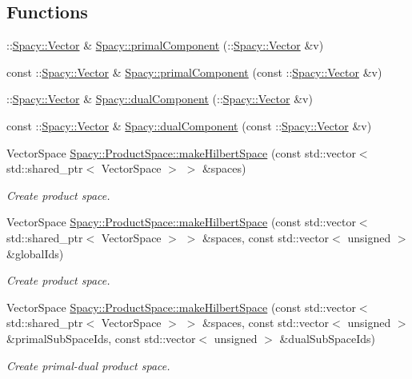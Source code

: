 \subsection*{Functions}
\begin{DoxyCompactItemize}
\item 
\+::\hyperlink{classSpacy_1_1Vector}{Spacy\+::\+Vector} \& \hyperlink{group__ProductSpaceGroup_gaa040ba5c24284687e0df19c99dd688a6}{Spacy\+::primal\+Component} (\+::\hyperlink{classSpacy_1_1Vector}{Spacy\+::\+Vector} \&v)
\item 
const \+::\hyperlink{classSpacy_1_1Vector}{Spacy\+::\+Vector} \& \hyperlink{group__ProductSpaceGroup_ga88c5bcc74072f75c63ab7d9448f80a7e}{Spacy\+::primal\+Component} (const \+::\hyperlink{classSpacy_1_1Vector}{Spacy\+::\+Vector} \&v)
\item 
\+::\hyperlink{classSpacy_1_1Vector}{Spacy\+::\+Vector} \& \hyperlink{group__ProductSpaceGroup_gafe51c084e3b03205db94e91309e834f7}{Spacy\+::dual\+Component} (\+::\hyperlink{classSpacy_1_1Vector}{Spacy\+::\+Vector} \&v)
\item 
const \+::\hyperlink{classSpacy_1_1Vector}{Spacy\+::\+Vector} \& \hyperlink{group__ProductSpaceGroup_gabe5978657aab46b1575e2521b336407d}{Spacy\+::dual\+Component} (const \+::\hyperlink{classSpacy_1_1Vector}{Spacy\+::\+Vector} \&v)
\item 
Vector\+Space \hyperlink{group__ProductSpaceGroup_gad4b421dd4563c7d575550ab4d5d3ff0d}{Spacy\+::\+Product\+Space\+::make\+Hilbert\+Space} (const std\+::vector$<$ std\+::shared\+\_\+ptr$<$ Vector\+Space $>$ $>$ \&spaces)
\begin{DoxyCompactList}\small\item\em Create product space. \end{DoxyCompactList}\item 
Vector\+Space \hyperlink{group__ProductSpaceGroup_gaee9c55c4b0f0b9d41bb6e1eba80f829f}{Spacy\+::\+Product\+Space\+::make\+Hilbert\+Space} (const std\+::vector$<$ std\+::shared\+\_\+ptr$<$ Vector\+Space $>$ $>$ \&spaces, const std\+::vector$<$ unsigned $>$ \&global\+Ids)
\begin{DoxyCompactList}\small\item\em Create product space. \end{DoxyCompactList}\item 
Vector\+Space \hyperlink{group__ProductSpaceGroup_ga5146524c4a6b3cb6f4a47b877cb2f55d}{Spacy\+::\+Product\+Space\+::make\+Hilbert\+Space} (const std\+::vector$<$ std\+::shared\+\_\+ptr$<$ Vector\+Space $>$ $>$ \&spaces, const std\+::vector$<$ unsigned $>$ \&primal\+Sub\+Space\+Ids, const std\+::vector$<$ unsigned $>$ \&dual\+Sub\+Space\+Ids)
\begin{DoxyCompactList}\small\item\em Create primal-\/dual product space. \end{DoxyCompactList}\end{DoxyCompactItemize}


